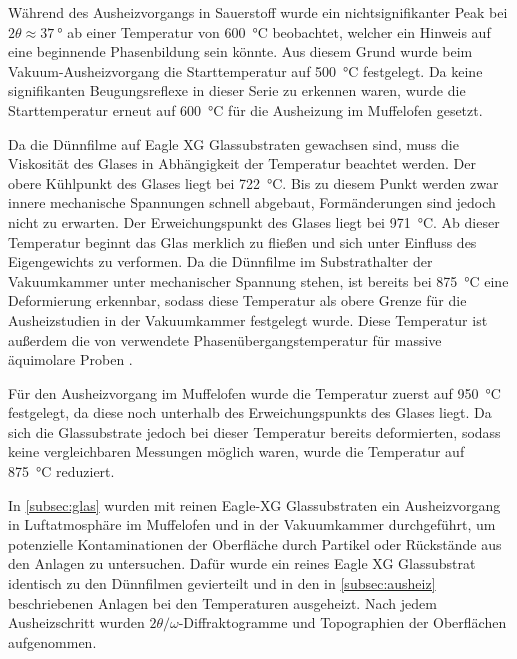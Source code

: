 Während des Aus\-heiz\-vor\-gangs in Sauerstoff wurde ein nichtsignifikanter Peak bei ${2\theta}{\approx}\qty{37}{\degree}$
ab einer Temperatur von \qty{600}{\degreeCelsius} beobachtet, welcher ein Hinweis auf eine beginnende Phasenbildung
sein könnte.
Aus diesem Grund wurde beim Vakuum-Aus\-heiz\-vor\-gang die Starttemperatur auf \qty{500}{\degreeCelsius} festgelegt.
Da keine signifikanten Beugungsreflexe in dieser Serie zu erkennen waren, wurde die Starttemperatur erneut
auf \qty{600}{\degreeCelsius} für die Ausheizung im Muffelofen gesetzt.

Da die Dünnfilme auf Eagle XG Glassubstraten gewachsen sind, muss die Viskosität des Glases in Abhängigkeit der
Temperatur beachtet werden.
Der obere Kühlpunkt des Glases liegt bei \qty{722}{\degreeCelsius}.
Bis zu diesem Punkt werden zwar innere mechanische Spannungen schnell abgebaut, Formänderungen sind jedoch nicht zu
erwarten.
Der Erweichungspunkt des Glases liegt bei \qty{971}{\degreeCelsius}.
Ab dieser Temperatur beginnt das Glas merklich zu fließen und sich unter Einfluss des Eigengewichts zu verformen.
Da die Dünnfilme im Substrathalter der Vakuumkammer unter mechanischer Spannung stehen, ist bereits bei
\qty{875}{\degreeCelsius} eine Deformierung erkennbar, sodass diese Temperatur als obere Grenze für die Ausheizstudien
in der Vakuumkammer festgelegt wurde.
Diese Temperatur ist außerdem die von  verwendete Phasenübergangstemperatur für
massive äquimolare Proben \autocite{Rost2015}.

Für den Aus\-heiz\-vor\-gang im Muffelofen wurde die Temperatur zuerst auf \qty{950}{\degreeCelsius} festgelegt, da diese noch
unterhalb des Erweichungspunkts des Glases liegt.
Da sich die Glassubstrate jedoch bei dieser Temperatur bereits deformierten, sodass keine vergleichbaren Messungen
möglich waren, wurde die Temperatur auf \qty{875}{\degreeCelsius} reduziert.

In \cref{subsec:glas} wurden mit reinen Eagle-XG Glassubstraten ein Aus\-heiz\-vor\-gang in Luftatmosphäre im Muffelofen
und in der Vakuumkammer durchgeführt, um potenzielle Kontaminationen der Oberfläche durch Partikel oder Rückstände
aus den Anlagen zu untersuchen.
Dafür wurde ein reines Eagle XG Glassubstrat identisch zu den Dünnfilmen gevierteilt und in den in \cref{subsec:ausheiz}
beschriebenen Anlagen bei den Temperaturen ausgeheizt.
Nach jedem Ausheizschritt wurden $2 \theta/\omega$-Diffraktogramme und Topographien der Oberflächen aufgenommen.


